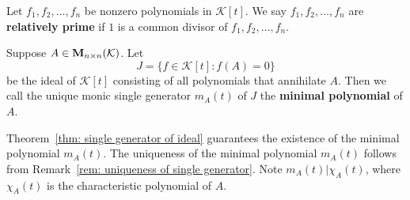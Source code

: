\begin{definitionenv}
    Let $f_1, f_2, \ldots, f_n$ be nonzero polynomials in $\mathcal K[t]$. We say $f_1, f_2, \ldots, f_n$ are \textbf{relatively prime} if $1$ is a common divisor of $f_1, f_2, \ldots, f_n$.
\end{definitionenv}
\begin{definitionenv}
    Suppose $A\in \mathbf{M}_{n\times n}(\mathcal K)$. Let
    $$ J = \{ f \in \mathcal K[t] : f(A) = 0 \} $$
    be the ideal of $\mathcal K[t]$ consisting of all polynomials that annihilate $A$. Then we call the unique monic single generator $m_A(t)$ of $J$ the \textbf{minimal polynomial} of $A$.
\end{definitionenv}
\begin{remarkenv}
    Theorem~\ref{thm: single generator of ideal} guarantees the existence of the minimal polynomial $m_A(t)$. The uniqueness of the minimal polynomial $m_A(t)$ follows from Remark~\ref{rem: uniqueness of single generator}. Note $m_A(t) | \chi_A(t)$, where $\chi_A(t)$ is the characteristic polynomial of $A$.
\end{remarkenv}
